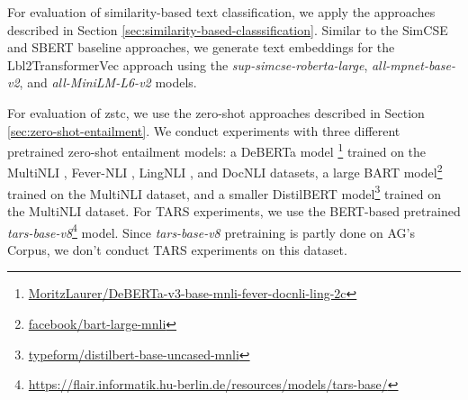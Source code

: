 \documentclass[sigconf]{acmart}
\begin{document}
For evaluation of similarity-based text classification, we apply the approaches described in Section \ref{sec:similarity-based-classsification}. Similar to the SimCSE and SBERT baseline approaches, we generate text embeddings for the Lbl2TransformerVec approach using the \textit{
sup-simcse-roberta-large}, \textit{all-mpnet-base-v2}, and \textit{all-MiniLM-L6-v2} models.

For evaluation of \ac{zstc}, we use the zero-shot approaches described in Section \ref{sec:zero-shot-entailment}. We conduct experiments with three different pretrained zero-shot entailment models: a DeBERTa \cite{DBLP:journals/corr/abs-2006-03654} model \footnote{\href{https://huggingface.co/MoritzLaurer/DeBERTa-v3-base-mnli-fever-docnli-ling-2c}{MoritzLaurer/DeBERTa-v3-base-mnli-fever-docnli-ling-2c}} trained on the MultiNLI \cite{williams-etal-2018-broad}, Fever-NLI \cite{thorne-etal-2018-fever}, LingNLI \cite{parrish-etal-2021-putting-linguist}, and DocNLI \cite{yin-etal-2021-docnli} datasets, a large BART \cite{lewis-etal-2020-bart} model\footnote{\href{https://huggingface.co/facebook/bart-large-mnli}{facebook/bart-large-mnli}} trained on the MultiNLI dataset, and a smaller DistilBERT \cite{Sanh2019DistilBERTAD} model\footnote{\href{https://huggingface.co/typeform/distilbert-base-uncased-mnli}{typeform/distilbert-base-uncased-mnli}} trained on the MultiNLI dataset. For TARS experiments, we use the BERT-based pretrained \textit{tars-base-v8}\footnote{\href{https://flair.informatik.hu-berlin.de/resources/models/tars-base/}{https://flair.informatik.hu-berlin.de/resources/models/tars-base/}} model. Since \textit{tars-base-v8} pretraining is partly done on AG's Corpus, we don't conduct TARS experiments on this dataset.
\end{document}

